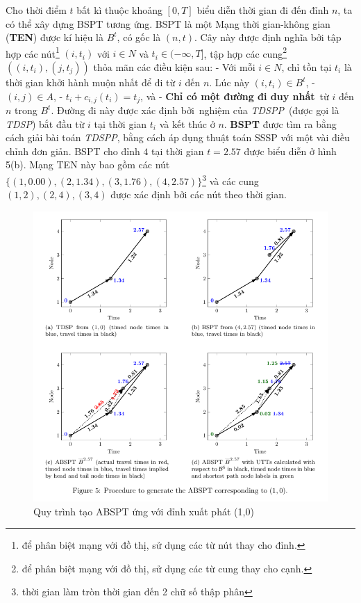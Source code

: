 \documentclass[../main.tex]{subfiles}
\begin{document}
Cho thời điểm \(t\) bất kì thuộc khoảng \([0, T]\) biểu diễn thời gian
đi đến đỉnh \(n\), ta có thể xây dựng BSPT tương ứng. BSPT là một Mạng
thời gian-không gian (\textbf{TEN}) được kí hiệu là \(B^t\), có gốc là
\((n, t)\). Cây này được định nghĩa bởi tập hợp các nút\footnote{để phân
  biệt mạng với đồ thị, sử dụng các từ nút thay cho đỉnh.} \((i, t_i)\)
với \(i \in N\) và \(t_i \in (-\infty, T]\), tập hợp các cung\footnote{để
  phân biệt mạng với đồ thị, sử dụng các từ cung thay cho cạnh.}
\(((i, t_i), (j, t_j))\) thỏa mãn các điều kiện sau: - Với mỗi
\(i\in N\), chỉ tồn tại \(t_i\) là thời gian khởi hành muộn nhất để đi
từ \(i\) đến \(n\). Lúc này \((i, t_i)\in B^t\), - \((i, j) \in A\), -
\(t_i + c_{i, j}(t_i) = t_j\), và - \textbf{Chỉ có một đường đi duy
nhất}~từ \(i\) đến \(n\) trong \(B^t\). Đường đi này được xác định
bởi~nghiệm của \emph{TDSPP}~(được gọi là \emph{TDSP}) bắt đầu từ \(i\)
tại thời gian \(t_i\) và kết thúc ở \(n\). \textbf{BSPT} được tìm ra
bằng cách giải bài toán \emph{TDSPP}, bằng cách áp dụng thuật toán SSSP
với một vài điều chỉnh đơn giản. BSPT cho đỉnh \(4\) tại thời gian
\(t=2.57\) được biểu diễn ở hình 5(b). Mạng TEN này bao gồm các nút
\(\{(1, 0.00), (2, 1.34), (3, 1.76), (4, 2.57)\}\)\footnote{thời gian
  làm tròn thời gian đến 2 chữ số thập phân} và các cung
\((1, 2), (2, 4), (3, 4)\) được xác định bởi các nút theo thời gian.

\begin{figure}

\centering
\includegraphics{images/Figure5.png}
\caption{Quy trình tạo ABSPT ứng với
đỉnh xuất phát (1,0)}
\label{fig:5}
\end{figure}
\end{document}
